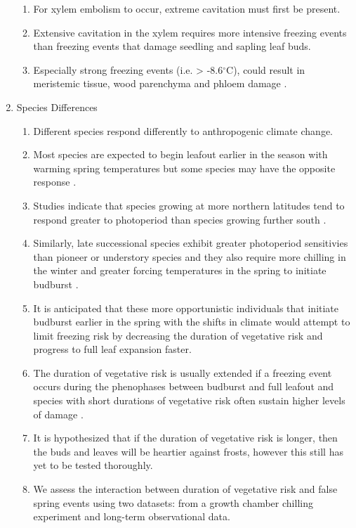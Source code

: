 \documentclass{article}\usepackage[]{graphicx}\usepackage[]{color}
\begin{document}
\begin{enumerate}
\begin {enumerate}
\item For xylem embolism to occur, extreme cavitation must first be present.
\item Extensive cavitation in the xylem requires more intensive freezing events than freezing events that damage seedling and sapling leaf buds.
\item Especially strong freezing events (i.e. > -8.6$^{\circ}$C), could result in meristemic tissue, wood parenchyma and phloem damage \citep{Sakai1987, Augspurger2011, Lenz2013}.
\end{enumerate}
\item Species Differences
\begin {enumerate}
\item Different species respond differently to anthropogenic climate change.
\item Most species are expected to begin leafout earlier in the season with warming spring temperatures but some species may have the opposite response \citep{Cleland2006, Yu2010, Xin2016}.
\item Studies indicate that species growing at more northern latitudes tend to respond greater to photoperiod than species growing further south \citep {Partanen2004, Viheraaarnio2006, Caffarra2011}.
\item Similarly, late successional species exhibit greater photoperiod sensitivies than pioneer or understory species \citep{Basler2012} and they also require more chilling in the winter and greater forcing temperatures in the spring to initiate budburst \citep{Laube2013}.
\item It is anticipated that these more opportunistic individuals that initiate budburst earlier in the spring with the shifts in climate would attempt to limit freezing risk by decreasing the duration of vegetative risk and progress to full leaf expansion faster.
\item The duration of vegetative risk is usually extended if a freezing event occurs during the phenophases between budburst and full leafout and species with short durations of vegetative risk often sustain higher levels of damage \citep {Augspurger2009}.
\item It is hypothesized that if the duration of vegetative risk is longer, then the buds and leaves will be heartier against frosts, however this still has yet to be tested thoroughly.
\item We assess the interaction between duration of vegetative risk and false spring events using two datasets: from a growth chamber chilling experiment and long-term observational data.
\end {enumerate}



\end{enumerate}
\end{document}
